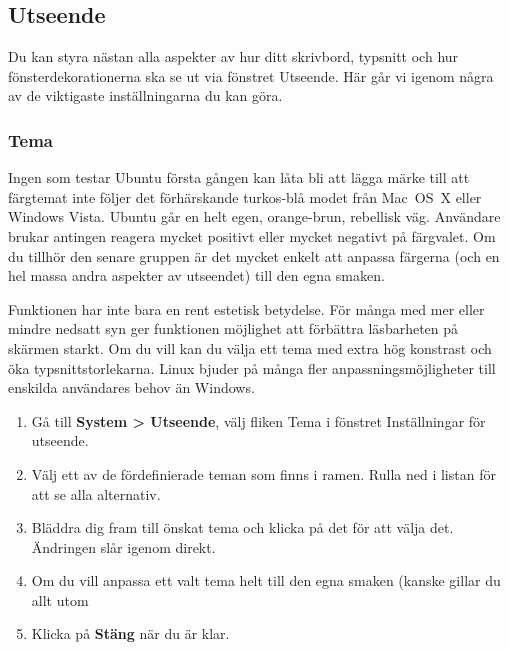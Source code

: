 \documentclass[a4paper,final]{memoir} %
\begin{document}
\subsection{Utseende}

Du kan styra nästan alla aspekter av hur ditt skrivbord, typsnitt och hur fönsterdekorationerna ska se ut via fönstret Utseende. Här går vi igenom några av de viktigaste inställningarna du kan göra.

\subsubsection{Tema}


Ingen som testar Ubuntu första gången kan låta bli att lägga märke till att färgtemat inte följer det förhärskande turkos-blå modet från Mac~OS~X eller Windows Vista. Ubuntu går en helt egen, orange-brun, rebellisk väg. Användare brukar antingen reagera mycket positivt eller mycket negativt på färgvalet. Om du tillhör den senare gruppen är det  mycket enkelt att anpassa färgerna (och en hel massa andra aspekter av utseendet) till den egna smaken. 

Funktionen har inte bara en rent estetisk betydelse. För många med mer eller mindre nedsatt syn ger funktionen möjlighet att förbättra läsbarheten på skärmen starkt. Om du vill kan du välja ett tema med extra hög konstrast och öka typsnittstorlekarna. Linux bjuder på många fler anpassningsmöjligheter till enskilda användares behov än Windows.



\begin{enumerate}

\item Gå till \textbf{System \textgreater{} Utseende}, välj fliken {Tema} i fönstret Inställningar för utseende.

\item Välj ett av de fördefinierade teman som finns i ramen. Rulla ned i listan för att se alla alternativ.

\item Bläddra dig fram till önskat tema och klicka på det för att välja det. Ändringen slår igenom direkt.

\item Om du vill anpassa ett valt tema helt till den egna smaken (kanske gillar du allt utom 

\item Klicka på \textbf{Stäng} när du är klar.

\end{enumerate}
\end{document}
